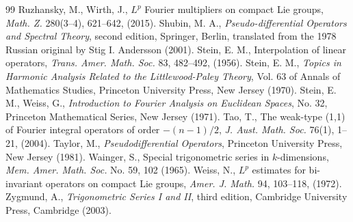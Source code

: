 \documentclass[12pt, reqno]{amsart}
\theoremstyle{definition}
\theoremstyle{remark}
\numberwithin{equation}{section}
\begin{document}
\begin{thebibliography}{99}
     Ruzhansky, M., Wirth, J., $L^p$ Fourier multipliers on compact Lie groups, \textit{Math. Z.} 280(3--4), 621--642, (2015).
     Shubin, M. A., \textit{Pseudo-differential Operators and Spectral Theory}, second edition, Springer, Berlin, translated from the 1978 Russian original by Stig I. Andersson (2001).
     Stein, E. M., Interpolation of linear operators, \textit{Trans. Amer. Math. Soc.} 83, 482--492, (1956).
     Stein, E. M., \textit{Topics in Harmonic Analysis Related to the Littlewood-Paley Theory}, Vol. 63 of Annals of Mathematics Studies, Princeton University Press, New Jersey (1970).
     Stein, E. M., Weiss, G., \textit{Introduction to Fourier Analysis on Euclidean Spaces}, No. 32, Princeton Mathematical Series, New Jersey (1971).
     Tao, T., The weak-type (1,1) of Fourier integral operators of order $-(n-1)/2$, \textit{J. Aust. Math. Soc.} 76(1), 1--21, (2004).
     Taylor, M., \textit{Pseudodifferential Operators}, Princeton University Press, New Jersey (1981).
     Wainger, S., Special trigonometric series in $k$-dimensions, \textit{Mem. Amer. Math. Soc.} No. 59, 102 (1965).
     Weiss, N., $L^p$ estimates for bi-invariant operators on compact Lie groups, \textit{Amer. J. Math.} 94, 103--118, (1972).
     Zygmund, A., \textit{Trigonometric Series I and II}, third edition, Cambridge University Press, Cambridge (2003).
\end{thebibliography}
\end{document}

